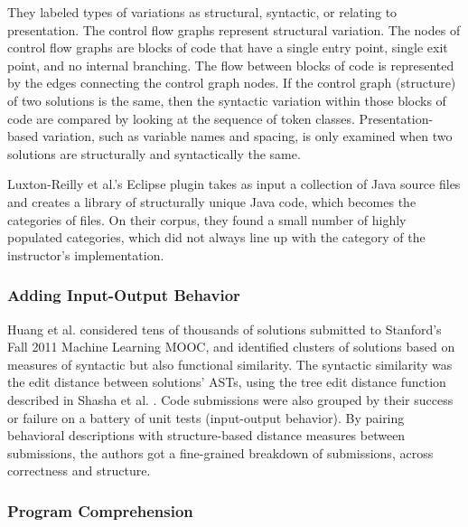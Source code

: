 They labeled types of variations as structural, syntactic, or relating to presentation. The control flow graphs represent structural variation. The nodes of control flow graphs are blocks of code that have a single entry point, single exit point, and no internal branching. The flow between blocks of code is represented by the edges connecting the control graph nodes. If the control graph (structure) of two solutions is the same, then the syntactic variation within those blocks of code are compared by looking at the sequence of token classes. Presentation-based variation, such as variable names and spacing, is only examined when two solutions are structurally and syntactically the same.

Luxton-Reilly et al.'s Eclipse plugin takes as input a collection of Java source files and creates a library of structurally unique Java code, which becomes the categories of files. On their corpus, they found a small number of highly populated categories, which did not always line up with the category of the instructor's implementation.

\subsubsection{Adding Input-Output Behavior}

Huang et al. \cite{MOOCshop} considered tens of thousands of solutions submitted to Stanford's Fall 2011 Machine Learning MOOC, and identified clusters of solutions based on measures of syntactic but also functional similarity. The syntactic similarity was the edit distance between solutions' ASTs, using the tree edit distance function described in Shasha et al. \cite{shasha1994exact}. Code submissions were also grouped by their success or failure on a battery of unit tests (input-output behavior). By pairing behavioral descriptions with structure-based distance measures between submissions, the authors got a fine-grained breakdown of submissions, across correctness and structure.

\subsubsection{Program Comprehension}

